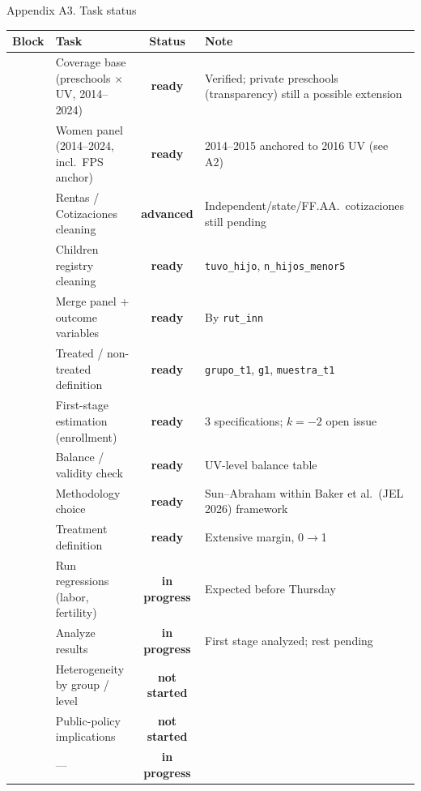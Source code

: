 \documentclass[aspectratio=169,10pt]{beamer}
\begin{document}
\begin{frame}{Appendix A3. Task status}
\vspace{-8pt}
\tiny
\setlength{\tabcolsep}{2.5pt}
\renewcommand{\arraystretch}{0.85}
\begin{center}
\begin{tabular}{@{}p{1.3cm}p{4.0cm}c p{6.0cm}@{}}
\toprule
\textbf{Block} & \textbf{Task} & \textbf{Status} & \textbf{Note} \\
\midrule
{}
 & Coverage base (preschools $\times$ UV, 2014--2024) & {\color{statuslisto}\textbf{ready}} & Verified; private preschools (transparency) still a possible extension \\
 & Women panel (2014--2024, incl.\ FPS anchor) & {\color{statuslisto}\textbf{ready}} & 2014--2015 anchored to 2016 UV (see A2) \\
 & Rentas / Cotizaciones cleaning & {\color{schoolgreen}\textbf{advanced}} & Independent/state/FF.AA.\ cotizaciones still pending \\
 & Children registry cleaning & {\color{statuslisto}\textbf{ready}} & \texttt{tuvo\_hijo}, \texttt{n\_hijos\_menor5} \\
 & Merge panel + outcome variables & {\color{statuslisto}\textbf{ready}} & By \texttt{rut\_inn} \\
 & Treated / non-treated definition & {\color{statuslisto}\textbf{ready}} & \texttt{grupo\_t1}, \texttt{g1}, \texttt{muestra\_t1} \\
\midrule
{}
 & First-stage estimation (enrollment) & {\color{statuslisto}\textbf{ready}} & 3 specifications; $k=-2$ open issue \\
 & Balance / validity check & {\color{statuslisto}\textbf{ready}} & UV-level balance table \\
\midrule
{}
 & Methodology choice & {\color{statuslisto}\textbf{ready}} & Sun--Abraham within Baker et al.\ (JEL 2026) framework \\
 & Treatment definition & {\color{statuslisto}\textbf{ready}} & Extensive margin, 0$\to$1 \\
 & Run regressions (labor, fertility) & {\color{statuspink}\textbf{in progress}} & Expected before Thursday \\
 & Analyze results & {\color{statuspink}\textbf{in progress}} & First stage analyzed; rest pending \\
\midrule
{}
 & Heterogeneity by group / level & {\color{statusred}\textbf{not started}} & \\
 & Public-policy implications & {\color{statusred}\textbf{not started}} & \\
\midrule
{} & --- & {\color{statuspink}\textbf{in progress}} & \\
\bottomrule
\end{tabular}
\end{center}
\end{frame}
\end{document}

